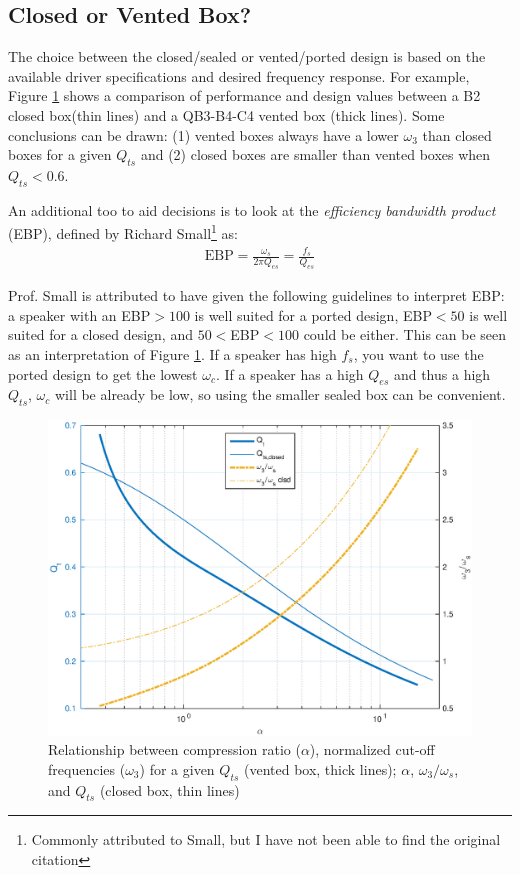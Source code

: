 \documentclass[10pt]{book}
\begin{document}
\subsection{Closed or Vented Box?}
The choice between the closed/sealed or vented/ported design is based on the available driver specifications and desired frequency response. For example, Figure \ref{fig:sealed_vs_ported_design} shows a comparison of performance and design values between a B2 closed box(thin lines) and a QB3-B4-C4 vented box (thick lines). Some conclusions can be drawn: (1) vented boxes always have a lower $\omega_3$ than closed boxes for a given $Q_{ts}$ and (2) closed boxes are smaller than vented boxes when $Q_{ts}<0.6$.



An additional too to aid decisions is to look at the \textit{efficiency bandwidth product} (EBP), defined by Richard Small\footnote{Commonly attributed to Small, but I have not been able to find the original citation} as:
\begin{align}
\mbox{EBP}=\frac{\omega_s}{2\pi Q_{es}}=\frac{f_s}{Q_{es}}
\end{align}

Prof. Small is attributed to have given the following guidelines to interpret EBP: a speaker with an EBP$>100$ is well suited for a ported design, EBP$<50$ is well suited for a closed design, and $50<$EBP$<100$ could be either. This can be seen as an interpretation of Figure \ref{fig:sealed_vs_ported_design}. If a speaker has high $f_s$, you want to use the ported design to get the lowest $\omega_c$. If a speaker has a high $Q_{es}$ and thus a high $Q_{ts}$, $\omega_c$ will be already be low, so using the smaller sealed box can be convenient.



\begin{figure}
\centering
\includegraphics[width=.75\textwidth]{matlab/sealed_vs_ported_design.eps}
\caption{Relationship between compression ratio ($\alpha$), normalized cut-off frequencies ($\omega_3$) for a given $Q_{ts}$ (vented box, thick lines); $\alpha$, $\omega_3/\omega_s$, and $Q_{ts}$ (closed box, thin lines)}\label{fig:sealed_vs_ported_design}
\end{figure}
\end{document}
